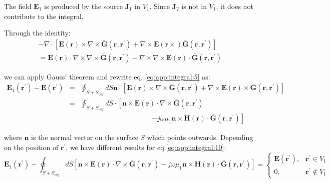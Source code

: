 		The field $\mathbf{E}_1$ is produced by the source $\mathbf{J}_1$ in $V_1$. Since $\mathbf{J}_2$ is not in $V_1$, it does not contribute to the integral.
	
		Through the identity:
		\begin{multline}
			-\nabla\cdot\left[\mathbf{E}(\mathbf{r})\times\nabla\times\mathbf{\bar{G}}(\mathbf{r},\mathbf{r^\prime}) + \nabla\times\mathbf{E}(\mathbf{r}\times)\mathbf{\bar{G}}(\mathbf{r},\mathbf{r^\prime})\right] \\
			= \mathbf{E}(\mathbf{r})\cdot\nabla\times\nabla\times\mathbf{\bar{G}}(\mathbf{r},\mathbf{r^\prime}) - \nabla\times\nabla\times\mathbf{E}(\mathbf{r})\cdot\mathbf{\bar{G}}(\mathbf{r},\mathbf{r^\prime}) \label{eq:app:integral:8}
		\end{multline}

		\noindent we can apply Gauss' theorem and rewrite eq. \eqref{eq:app:integral:5} as:
		\begin{eqnarray}
			\mathbf{E}_1(\mathbf{r}^\prime)-\mathbf{E}(\mathbf{r}^\prime) &=& \oint_{S+S_{inf}} dS\mathbf{n}\cdot \left[\mathbf{E}(\mathbf{r})\times\nabla\times\mathbf{\bar{G}}(\mathbf{r},\mathbf{r^\prime})+\nabla\times\mathbf{E}(\mathbf{r})\times\mathbf{\bar{G}}(\mathbf{r},\mathbf{r^\prime})\right] \label{eq:app:integral:9} \\
			&=& \oint_{S+S_{inf}} dS\cdot \left[\mathbf{n}\times\mathbf{E}(\mathbf{r})\cdot\nabla\times\mathbf{\bar{G}}(\mathbf{r},\mathbf{r^\prime}) \right.\nonumber \\
			&& ~~~~~~~~~~~~~~~~~~~~~~~~~~~~~~~~~~~~~~~~~~~~~~ \left. -j\omega\mu_1\mathbf{n}\times\mathbf{H}(\mathbf{r})\cdot\mathbf{\bar{G}}(\mathbf{r},\mathbf{r^\prime})\right] \label{eq:app:integral:10}
		\end{eqnarray}

		\noindent where $\mathbf{n}$ is the normal vector on the surface $S$ which points outwards. Depending on the position of $\mathbf{r^\prime}$, we have different results for eq.\eqref{eq:app:integral:10}:
		\begin{equation}
			 \mathbf{E}_1(\mathbf{r^\prime}) - \oint_{S+S_{inf}} dS \left[\mathbf{n}\times\mathbf{E}(\mathbf{r})\cdot\nabla\times\mathbf{\bar{G}}(\mathbf{r},\mathbf{r^\prime}) 	-j\omega\mu_1\mathbf{n}\times\mathbf{H}(\mathbf{r})\cdot\mathbf{\bar{G}}(\mathbf{r},\mathbf{r^\prime})\right]  = \begin{cases}
				\mathbf{E}(\mathbf{r}^\prime), &\mathbf{r^\prime}\in V_1 \\
				0, &\mathbf{r^\prime}\notin V_1
			\end{cases} \label{eq:app:integral:11}
		\end{equation}

